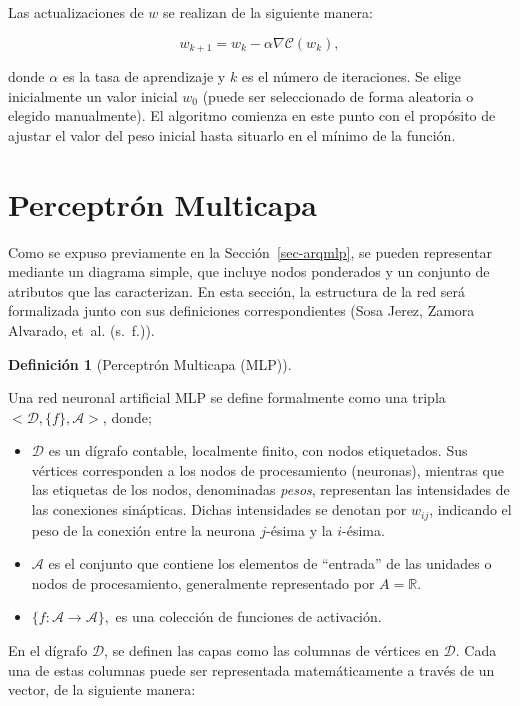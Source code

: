 \documentclass[
  us-letterpaper,
]{scrreprt}
\theoremstyle{definition}
\theoremstyle{plain}
\theoremstyle{plain}
\theoremstyle{definition}
\newtheorem{definition}{Definición}[chapter]
\theoremstyle{remark}
\begin{document}
Las actualizaciones de \(w\) se realizan de la siguiente manera:

\[w_{k+1} = w_k - \alpha \nabla\mathcal C(w_k),\]

donde \(\alpha\) es la tasa de aprendizaje y \(k\) es el número de
iteraciones. Se elige inicialmente un valor inicial \(w_0\) (puede ser
seleccionado de forma aleatoria o elegido manualmente). El algoritmo
comienza en este punto con el propósito de ajustar el valor del peso
inicial hasta situarlo en el mínimo de la función.

\section{Perceptrón Multicapa}\label{perceptruxf3n-multicapa}

Como se expuso previamente en la Sección~\ref{sec-arqmlp}, se pueden
representar mediante un diagrama simple, que incluye nodos ponderados y
un conjunto de atributos que las caracterizan. En esta sección, la
estructura de la red será formalizada junto con sus definiciones
correspondientes (Sosa Jerez, Zamora Alvarado, et~al. (s.~f.)).

\begin{definition}[Perceptrón Multicapa
(MLP)]\protect\hypertarget{def-mlp}{}\label{def-mlp}

Una red neuronal artificial MLP se define formalmente como una tripla
\(<\mathscr D, \{f\}, \mathscr A>\), donde;

\begin{itemize}
\item
  \(\mathscr D\) es un dígrafo contable, localmente finito, con nodos
  etiquetados. Sus vértices corresponden a los nodos de procesamiento
  (neuronas), mientras que las etiquetas de los nodos, denominadas
  \emph{pesos}, representan las intensidades de las conexiones
  sinápticas. Dichas intensidades se denotan por \(w_{ij}\), indicando
  el peso de la conexión entre la neurona \(j\)-ésima y la \(i\)-ésima.
\item
  \(\mathscr A\) es el conjunto que contiene los elementos de
  ``entrada'' de las unidades o nodos de procesamiento, generalmente
  representado por \(A =\mathbb R\).
\item
  \(\{f: \mathscr A\to\mathscr A\},\) es una colección de funciones de
  activación.
\end{itemize}

\end{definition}

En el dígrafo \(\mathscr D\), se definen las capas como las columnas de
vértices en \(\mathscr D\). Cada una de estas columnas puede ser
representada matemáticamente a través de un vector, de la siguiente
manera:
\end{document}

